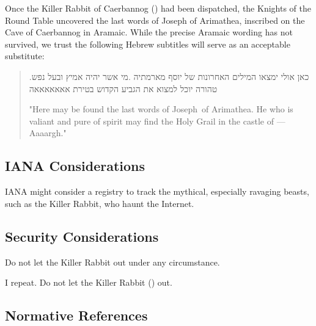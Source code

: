 \documentclass{metanorma}
\begin{document}
Once the Killer Rabbit of Caerbannog () had been
dispatched, the Knights of the Round Table uncovered the last
words of Joseph of Arimathea, inscribed on the Cave of Caerbannog
in Aramaic.  While the precise Aramaic wording has not survived,
we trust the following Hebrew subtitles will serve as an
acceptable substitute:


\begin{quote}
.כאן אולי ימצאו המילים האחרונות של יוסף מארמתיה
.מי אשר יהיה אמיץ ובעל נפש טהורה יוכל למצוא את הגביע הקדוש בטירת אאאאאאאה

"Here may be found the last words of Joseph~of Arimathea.
He who is valiant and pure of spirit may find the Holy Grail
in the castle of --- Aaaargh."
\end{quote}



\subsection{IANA Considerations}

IANA might consider a registry to track the mythical, especially
ravaging beasts, such as the Killer Rabbit, who haunt the Internet.


\subsection{Security Considerations}

Do not let the Killer Rabbit out under any circumstance.

I repeat. Do not let the Killer Rabbit () out.



\subsection{Normative References}
\begin{thebibliography}{1}
\end{thebibliography}
\end{document}
